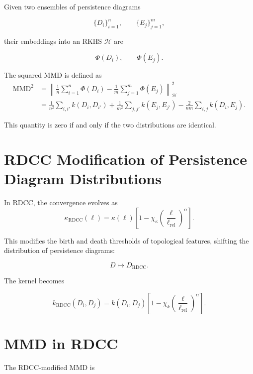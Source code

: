 \documentclass[11pt,a4paper]{article}
\begin{document}
Given two ensembles of persistence diagrams


\[
    \{D_{i}\}_{i=1}^{n}, \qquad
    \{E_{j}\}_{j=1}^{m},
\]


their embeddings into an RKHS $\mathcal{H}$ are


\[
    \Phi(D_{i}), \qquad \Phi(E_{j}).
\]



The squared MMD is defined as
\begin{align}
    \mathrm{MMD}^{2}
    &= \left\|
        \frac{1}{n} \sum_{i=1}^{n} \Phi(D_{i})
        - \frac{1}{m} \sum_{j=1}^{m} \Phi(E_{j})
       \right\|_{\mathcal{H}}^{2} \\
    &= \frac{1}{n^{2}} \sum_{i,i'} k(D_{i}, D_{i'})
     + \frac{1}{m^{2}} \sum_{j,j'} k(E_{j}, E_{j'})
     - \frac{2}{nm} \sum_{i,j} k(D_{i}, E_{j}).
\end{align}

This quantity is zero if and only if the two distributions are identical.
\section{RDCC Modification of Persistence Diagram Distributions}

In RDCC, the convergence evolves as
\begin{equation}
    \kappa_{\mathrm{RDCC}}(\ell)
    = \kappa(\ell)
      \left[
        1 - \chi_{\kappa}
        \left(\frac{\ell}{\ell_{\mathrm{rel}}}\right)^{\alpha}
      \right].
\end{equation}

This modifies the birth and death thresholds of topological features, shifting the 
distribution of persistence diagrams:


\[
    D \mapsto D_{\mathrm{RDCC}}.
\]



The kernel becomes


\[
    k_{\mathrm{RDCC}}(D_{i}, D_{j})
    = k(D_{i}, D_{j})
      \left[
        1 - \chi_{k}
        \left(\frac{\ell}{\ell_{\mathrm{rel}}}\right)^{\alpha}
      \right].
\]


\section{MMD in RDCC}

The RDCC-modified MMD is
\end{document}
